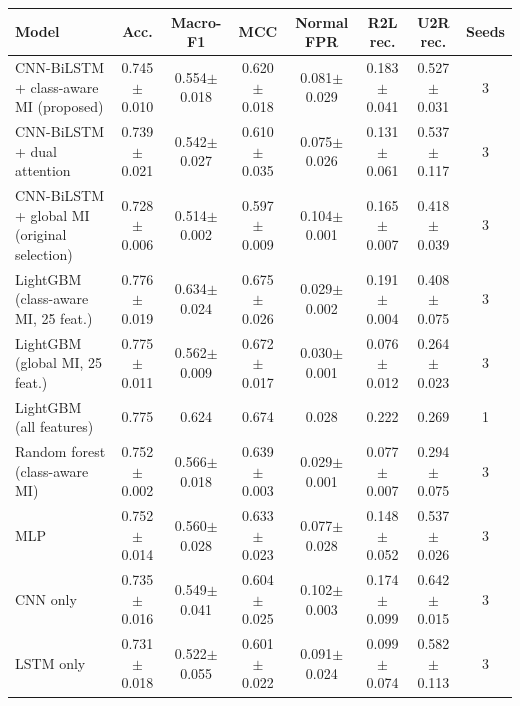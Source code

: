 \begin{tabular}{lccccccc}
\toprule
Model & Acc. & Macro-F1 & MCC & Normal FPR & R2L rec. & U2R rec. & Seeds \\
\midrule
CNN-BiLSTM + class-aware MI (proposed) & 0.745$\pm$0.010 & 0.554$\pm$0.018 & 0.620$\pm$0.018 & 0.081$\pm$0.029 & 0.183$\pm$0.041 & 0.527$\pm$0.031 & 3 \\
CNN-BiLSTM + dual attention & 0.739$\pm$0.021 & 0.542$\pm$0.027 & 0.610$\pm$0.035 & 0.075$\pm$0.026 & 0.131$\pm$0.061 & 0.537$\pm$0.117 & 3 \\
CNN-BiLSTM + global MI (original selection) & 0.728$\pm$0.006 & 0.514$\pm$0.002 & 0.597$\pm$0.009 & 0.104$\pm$0.001 & 0.165$\pm$0.007 & 0.418$\pm$0.039 & 3 \\
LightGBM (class-aware MI, 25 feat.) & 0.776$\pm$0.019 & 0.634$\pm$0.024 & 0.675$\pm$0.026 & 0.029$\pm$0.002 & 0.191$\pm$0.004 & 0.408$\pm$0.075 & 3 \\
LightGBM (global MI, 25 feat.) & 0.775$\pm$0.011 & 0.562$\pm$0.009 & 0.672$\pm$0.017 & 0.030$\pm$0.001 & 0.076$\pm$0.012 & 0.264$\pm$0.023 & 3 \\
LightGBM (all features) & 0.775 & 0.624 & 0.674 & 0.028 & 0.222 & 0.269 & 1 \\
Random forest (class-aware MI) & 0.752$\pm$0.002 & 0.566$\pm$0.018 & 0.639$\pm$0.003 & 0.029$\pm$0.001 & 0.077$\pm$0.007 & 0.294$\pm$0.075 & 3 \\
MLP & 0.752$\pm$0.014 & 0.560$\pm$0.028 & 0.633$\pm$0.023 & 0.077$\pm$0.028 & 0.148$\pm$0.052 & 0.537$\pm$0.026 & 3 \\
CNN only & 0.735$\pm$0.016 & 0.549$\pm$0.041 & 0.604$\pm$0.025 & 0.102$\pm$0.003 & 0.174$\pm$0.099 & 0.642$\pm$0.015 & 3 \\
LSTM only & 0.731$\pm$0.018 & 0.522$\pm$0.055 & 0.601$\pm$0.022 & 0.091$\pm$0.024 & 0.099$\pm$0.074 & 0.582$\pm$0.113 & 3 \\
\bottomrule
\end{tabular}
